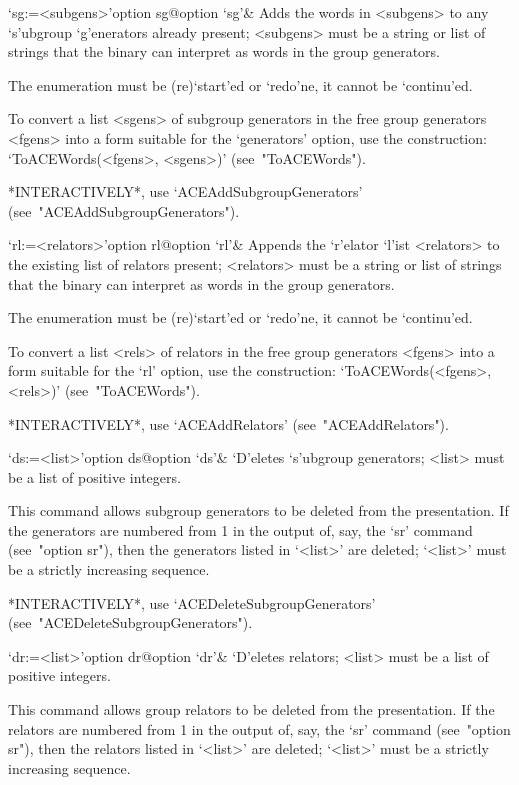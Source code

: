 \>`sg:=<subgens>'{option sg}@{option `sg'}&
Adds the words in <subgens> to  any  `s'ubgroup  `g'enerators  already
present; <subgens> must be a string or list of strings that the {\ACE}
binary can interpret as words in the group generators.

The enumeration must  be  (re)`start'ed  or  `redo'ne,  it  cannot  be
`continu'ed.

To convert a {\GAP} list <sgens> of subgroup generators  in  the  free
group generators <fgens> into a form  suitable  for  the  `generators'
option,   use   the   construction:   `ToACEWords(<fgens>,   <sgens>)'
(see~"ToACEWords").

*INTERACTIVELY*,            use             `ACEAddSubgroupGenerators'
(see~"ACEAddSubgroupGenerators").

\>`rl:=<relators>'{option rl}@{option `rl'}&
Appends the `r'elator  `l'ist  <relators>  to  the  existing  list  of
relators present; <relators> must be a string or list of strings  that
the {\ACE} binary can interpret as words in the group generators.

The enumeration must  be  (re)`start'ed  or  `redo'ne,  it  cannot  be
`continu'ed.

To convert a  {\GAP}  list  <rels>  of  relators  in  the  free  group
generators <fgens> into a form suitable for the `rl' option,  use  the
construction: `ToACEWords(<fgens>, <rels>)' (see~"ToACEWords").

*INTERACTIVELY*, use `ACEAddRelators' (see~"ACEAddRelators").

\>`ds:=<list>'{option ds}@{option `ds'}&
`D'eletes `s'ubgroup generators; <list> must be  a  list  of  positive
integers.

This command  allows  subgroup  generators  to  be  deleted  from  the
presentation. If the generators are numbered from 1 in the output  of,
say, the `sr' command (see~"option sr"), then the generators listed in
`<list>' are deleted; `<list>' must be a strictly increasing sequence.

*INTERACTIVELY*,           use           `ACEDeleteSubgroupGenerators'
(see~"ACEDeleteSubgroupGenerators").

\>`dr:=<list>'{option dr}@{option `dr'}&
`D'eletes relators; <list> must be a list of positive integers.

This  command  allows  group  relators  to   be   deleted   from   the
presentation. If the relators are numbered from 1 in  the  output  of,
say, the `sr' command (see~"option sr"), then the relators  listed  in
`<list>' are deleted; `<list>' must be a strictly increasing sequence.

